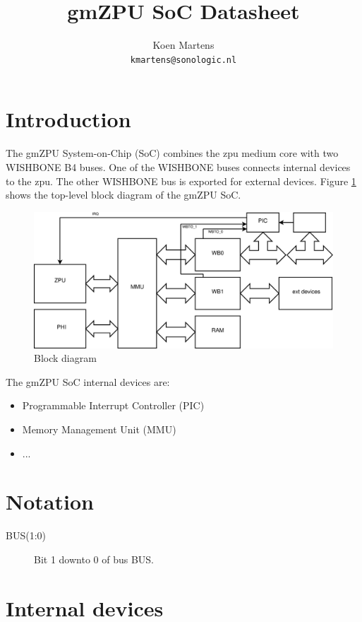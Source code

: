 \documentclass[a4paper,twocolumn,12pt]{article}
\title{gmZPU SoC Datasheet}
\author{Koen Martens\\
        \texttt{kmartens@sonologic.nl}}
\begin{document}
\maketitle

\section{Introduction}

The gmZPU System-on-Chip (SoC) combines the zpu medium core \cite{zpu} with two WISHBONE B4 \cite{wishbone} buses. One of the WISHBONE buses connects internal devices to the zpu. The other WISHBONE bus is exported for external devices. Figure \ref{fig:block_diagram} shows the top-level block diagram of the gmZPU SoC.

\begin{figure}
    \centering
    \includegraphics[width=13cm]{gmzpu_block_diagram}
    \caption{Block diagram}
    \label{fig:block_diagram}
\end{figure}

The gmZPU SoC internal devices are:

\begin{itemize}
    \item Programmable Interrupt Controller (PIC)
    \item Memory Management Unit (MMU)
    \item ...
\end{itemize}

\section{Notation}

\begin{description}
    \item[BUS(1:0)] Bit 1 downto 0 of bus BUS.
\end{description}

\section{Internal devices}
\end{document}
